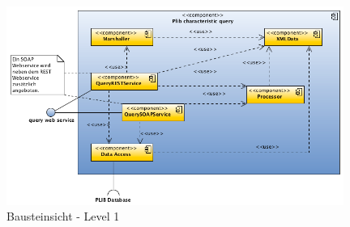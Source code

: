 \begin{figure}[htbp]
	\centering
		\includegraphics[width=0.98\textwidth]{images/bausteinsicht_plib_level1.png}
	\caption{Bausteinsicht - Level 1}
	\label{fig:bausteinsicht_level1}
\end{figure}

